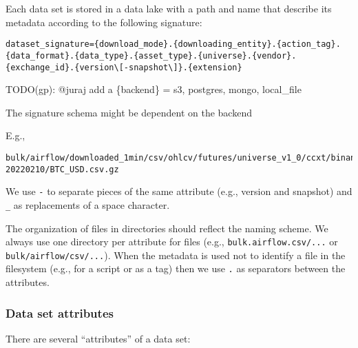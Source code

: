 \documentclass[11pt, reqno]{amsart}
\theoremstyle{definition}
\theoremstyle{remark}
\begin{document}
Each data set is stored in a data lake with a path and name that
describe its metadata according to the following signature:

\begin{verbatim}
dataset_signature={download_mode}.{downloading_entity}.{action_tag}.{data_format}.{data_type}.{asset_type}.{universe}.{vendor}.{exchange_id}.{version\[-snapshot\]}.{extension}
\end{verbatim}

TODO(gp): @juraj add a \{backend\} = s3, postgres, mongo, local\_file

The signature schema might be dependent on the backend

E.g.,

\begin{verbatim}
bulk/airflow/downloaded_1min/csv/ohlcv/futures/universe_v1_0/ccxt/binance/v1_0-20220210/BTC_USD.csv.gz
\end{verbatim}

We use \verb|-| to separate pieces of the same attribute (e.g.,
version and snapshot) and \verb|_| as replacements of a space
character.

The organization of files in directories should reflect the naming
scheme. We always use one directory per attribute for files (e.g.,
\verb|bulk.airflow.csv/...| or \verb|bulk/airflow/csv/...|). When
the metadata is used not to identify a file in the filesystem (e.g., for
a script or as a tag) then we use \verb|.| as separators between the
attributes.

\subsubsection{Data set attributes}\label{data-set-attributes}

There are several ``attributes'' of a data set:
\end{document}
